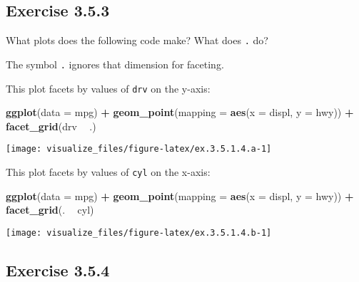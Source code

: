 \documentclass[]{book}
\newenvironment{Shaded}{\begin{snugshade}}{\end{snugshade}}
\newcommand{\DataTypeTok}[1]{\textcolor[rgb]{0.13,0.29,0.53}{#1}}
\newcommand{\KeywordTok}[1]{\textcolor[rgb]{0.13,0.29,0.53}{\textbf{#1}}}
\newcommand{\NormalTok}[1]{#1}
\newcommand{\OperatorTok}[1]{\textcolor[rgb]{0.81,0.36,0.00}{\textbf{#1}}}
\newcommand{\StringTok}[1]{\textcolor[rgb]{0.31,0.60,0.02}{#1}}
\theoremstyle{plain}
\theoremstyle{remark}
\theoremstyle{definition}
\theoremstyle{definition}
\theoremstyle{definition}
\theoremstyle{remark}
\begin{document}
\hypertarget{exercise-3.5.3}{%
\subsection*{\texorpdfstring{Exercise
{3.5.3}}{Exercise 3.5.3}}\label{exercise-3.5.3}}

What plots does the following code make? What does \texttt{.} do?

The symbol \texttt{.} ignores that dimension for faceting.

This plot facets by values of \texttt{drv} on the y-axis:

\begin{Shaded}
\begin{Highlighting}[]
\KeywordTok{ggplot}\NormalTok{(}\DataTypeTok{data =}\NormalTok{ mpg) }\OperatorTok{+}
\StringTok{  }\KeywordTok{geom_point}\NormalTok{(}\DataTypeTok{mapping =} \KeywordTok{aes}\NormalTok{(}\DataTypeTok{x =}\NormalTok{ displ, }\DataTypeTok{y =}\NormalTok{ hwy)) }\OperatorTok{+}
\StringTok{  }\KeywordTok{facet_grid}\NormalTok{(drv }\OperatorTok{~}\StringTok{ }\NormalTok{.)}
\end{Highlighting}
\end{Shaded}

\begin{center}\texttt{[image: visualize\_files/figure-latex/ex.3.5.1.4.a-1]} \end{center}

This plot facets by values of \texttt{cyl} on the x-axis:

\begin{Shaded}
\begin{Highlighting}[]
\KeywordTok{ggplot}\NormalTok{(}\DataTypeTok{data =}\NormalTok{ mpg) }\OperatorTok{+}
\StringTok{  }\KeywordTok{geom_point}\NormalTok{(}\DataTypeTok{mapping =} \KeywordTok{aes}\NormalTok{(}\DataTypeTok{x =}\NormalTok{ displ, }\DataTypeTok{y =}\NormalTok{ hwy)) }\OperatorTok{+}
\StringTok{  }\KeywordTok{facet_grid}\NormalTok{(. }\OperatorTok{~}\StringTok{ }\NormalTok{cyl)}
\end{Highlighting}
\end{Shaded}

\begin{center}\texttt{[image: visualize\_files/figure-latex/ex.3.5.1.4.b-1]} \end{center}

\hypertarget{exercise-3.5.4}{%
\subsection*{\texorpdfstring{Exercise
{3.5.4}}{Exercise 3.5.4}}\label{exercise-3.5.4}}
\end{document}
